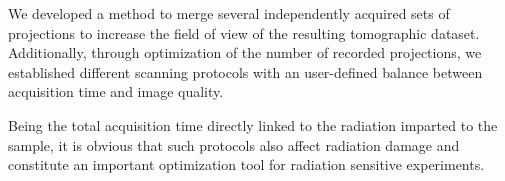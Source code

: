 We developed a method to merge several independently acquired sets of projections to increase the field of view of the resulting tomographic dataset. Additionally, through optimization of the number of recorded projections, we established different scanning protocols with an user-defined balance between acquisition time and image quality.

Being the total acquisition time directly linked to the radiation imparted to the sample, it is obvious that such protocols also affect radiation damage and constitute an important optimization tool for radiation sensitive experiments.